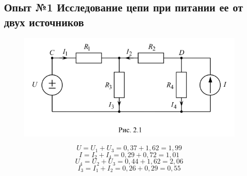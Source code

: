 \documentclass[a4paper,12pt]{report}
\begin{document}
\begin{flushleft}
    \item\subsection*{Опыт №1 Исследование цепи при питании ее от двух источников}
    \item \begin{figure}[h!]
        \includegraphics[width=1.1\textwidth]{scheme_1.png}
        \label{ris:image1}
    \end{figure}
    
    \[  U=U_1+U_3=0,37+1,62=1,99      \]
    \[  I=I_2+I_4=0,29+0,72=1,01   \] 
    \[  U_4=U_2+U_3=0,44+1,62=2,06 \] 
    \[  I_3=I_1+I_2=0,26+0,29=0,55 \]
    \newpage


\end{flushleft}
\end{document}
